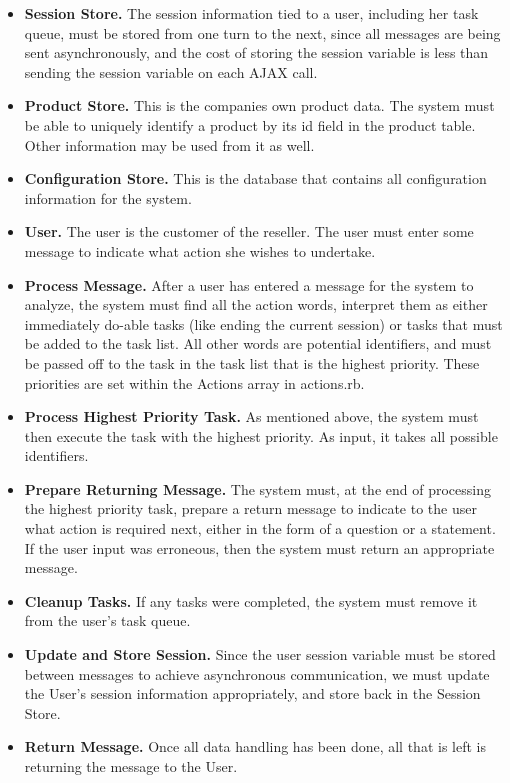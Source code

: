 \documentclass[11pt, titlepage]{article}
\begin{document}
\begin{itemize}
\item \textbf{Session Store.}
The session information tied to a user, including her task queue, must be
stored from one turn to the next, since all messages are being sent
asynchronously, and the cost of storing the session variable is less than
sending the session variable on each AJAX call.
\item \textbf{Product Store.}
This is the companies own product data.  The system must be able to 
uniquely identify a product by its id field in the product table.  Other
information may be used from it as well.
\item \textbf{Configuration Store.}
This is the database that contains all configuration information for the
system.
\item \textbf{User.}
The user is the customer of the reseller.  The user must enter some message
to indicate what action she wishes to undertake.
\item \textbf{Process Message.}
After a user has entered a message for the system to analyze, the system
must find all the action words, interpret them as either immediately do-able
tasks (like ending the current session) or tasks that must be added to the task
list.  All other words are potential identifiers, and must be passed off
to the task in the task list that is the highest priority.  These priorities
are set within the Actions array in actions.rb.
\item \textbf{Process Highest Priority Task.}
As mentioned above, the system must then execute the task with the highest
priority.  As input, it takes all possible identifiers.
\item \textbf{Prepare Returning Message.}
The system must, at the end of processing the highest priority task, prepare
a return message to indicate to the user what action is required next, either
in the form of a question or a statement.  If the user input was erroneous,
then the system must return an appropriate message.
\item \textbf{Cleanup Tasks.}
If any tasks were completed, the system must remove it from the user's
task queue.
\item \textbf{Update and Store Session.}
Since the user session variable must be stored between messages to achieve
asynchronous communication, we must update the User's session information
appropriately, and store back in the Session Store.
\item \textbf{Return Message.}
Once all data handling has been done, all that is left is returning the message
to the User.
\end{itemize}
\end{document}
